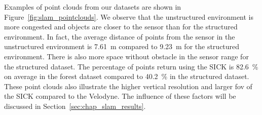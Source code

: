 Examples of point clouds from our datasets are shown in Figure~\ref{fig:slam_pointclouds}. We observe that the unstructured environment is more congested and objects are closer to the sensor than for the structured environment. In fact, the average distance of points from the sensor in the unstructured environment is \SI{7.61}{\meter} compared to \SI{9.23}{\meter} for the structured environment. There is also more space without obstacle in the sensor range for the structured dataset. The percentage of points return using the SICK is \SI{82.6}{\percent} on average in the forest dataset compared to \SI{40.2}{\percent} in the structured dataset. These point clouds also illustrate the higher vertical resolution and larger \gls*{fov} of the SICK compared to the Velodyne. The influence of these factors will be discussed in Section~\ref{sec:chap_slam_results}.

